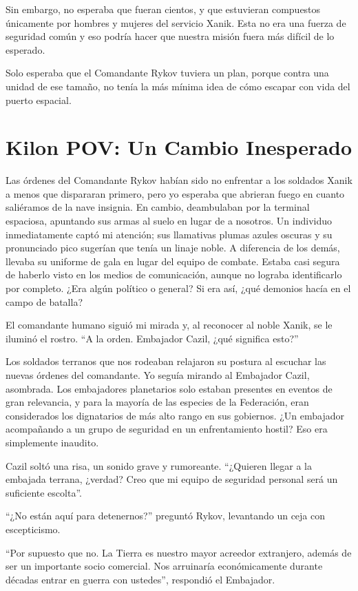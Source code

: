 \documentclass[spanish,12pt,a4paper,oneside,titlepage]{book}
\begin{document}
    Sin embargo, no esperaba que fueran cientos, y que estuvieran compuestos únicamente por hombres y mujeres del servicio Xanik. Esta no era una fuerza de seguridad común y eso podría hacer que nuestra misión fuera más difícil de lo esperado.

    Solo esperaba que el Comandante Rykov tuviera un plan, porque contra una unidad de ese tamaño, no tenía la más mínima idea de cómo escapar con vida del puerto espacial.

    \chapter{Kilon POV: Un Cambio Inesperado}

    Las órdenes del Comandante Rykov habían sido no enfrentar a los soldados Xanik a menos que dispararan primero, pero yo esperaba que abrieran fuego en cuanto saliéramos de la nave insignia. En cambio, deambulaban por la terminal espaciosa, apuntando sus armas al suelo en lugar de a nosotros. Un individuo inmediatamente captó mi atención; sus llamativas plumas azules oscuras y su pronunciado pico sugerían que tenía un linaje noble. A diferencia de los demás, llevaba su uniforme de gala en lugar del equipo de combate. Estaba casi segura de haberlo visto en los medios de comunicación, aunque no lograba identificarlo por completo. ¿Era algún político o general? Si era así, ¿qué demonios hacía en el campo de batalla?

    El comandante humano siguió mi mirada y, al reconocer al noble Xanik, se le iluminó el rostro. ``A la orden. Embajador Cazil, ¿qué significa esto?''

    Los soldados terranos que nos rodeaban relajaron su postura al escuchar las nuevas órdenes del comandante. Yo seguía mirando al Embajador Cazil, asombrada. Los embajadores planetarios solo estaban presentes en eventos de gran relevancia, y para la mayoría de las especies de la Federación, eran considerados los dignatarios de más alto rango en sus gobiernos. ¿Un embajador acompañando a un grupo de seguridad en un enfrentamiento hostil? Eso era simplemente inaudito.

    Cazil soltó una risa, un sonido grave y rumoreante. ``¿Quieren llegar a la embajada terrana, ¿verdad? Creo que mi equipo de seguridad personal será un suficiente escolta''.

    ``¿No están aquí para detenernos?'' preguntó Rykov, levantando un ceja con escepticismo.

    ``Por supuesto que no. La Tierra es nuestro mayor acreedor extranjero, además de ser un importante socio comercial. Nos arruinaría económicamente durante décadas entrar en guerra con ustedes'', respondió el Embajador.
\end{document}
